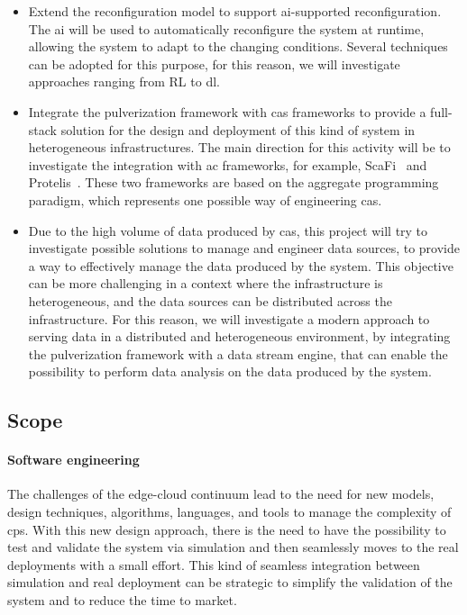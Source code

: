 \documentclass[12pt]{article}
\begin{document}
\begin{itemize}
	\item Extend the reconfiguration model to support \ac{ai}-supported reconfiguration.
		The \ac{ai} will be used to automatically reconfigure the system at runtime,
		allowing the system to adapt to the changing conditions.
		Several techniques can be adopted for this purpose,
		for this reason,
		we will investigate approaches ranging from RL to \ac{dl}.
	\item Integrate the pulverization framework with \ac{cas} frameworks to provide a full-stack solution for the design and deployment of this kind of system in heterogeneous infrastructures.
		The main direction for this activity will be to investigate the integration with \ac{ac} frameworks,
		for example,
		ScaFi~\cite{DBLP:journals/softx/CasadeiVAP22} and Protelis~\cite{DBLP:conf/sac/PianiniVB15}.
		These two frameworks are based on the aggregate programming paradigm,
		which represents one possible way of engineering \ac{cas}.
	\item Due to the high volume of data produced by \ac{cas},
		this project will try to investigate possible solutions to manage and engineer data sources,
		to provide a way to effectively manage the data produced by the system.
		This objective can be more challenging in a context where the infrastructure is heterogeneous,
		and the data sources can be distributed across the infrastructure.
		For this reason,
		we will investigate a modern approach to serving data in a distributed and heterogeneous environment,
		by integrating the pulverization framework with a data stream engine,
		that can enable the possibility to perform data analysis on the data produced by the system.
\end{itemize}

\subsection{Scope}\label{subsec:scope}

\paragraph{Software engineering}
The challenges of the edge-cloud continuum lead to the need for new models,
design techniques, algorithms, languages, and tools to manage the complexity
of \ac{cps}.
%
With this new design approach,
there is the need to have the possibility to test and validate the system via simulation
and then seamlessly moves to the real deployments with a small effort.
%
This kind of seamless integration between simulation and real deployment can be strategic
to simplify the validation of the system and to reduce the time to market.
\end{document}
